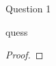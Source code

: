 \begin{solution}{Question 1}\label{ques:1}
    \begin{question}
    quess
    \end{question}
    \tcblower{}
    \begin{proof}
    \end{proof}
\end{solution}
